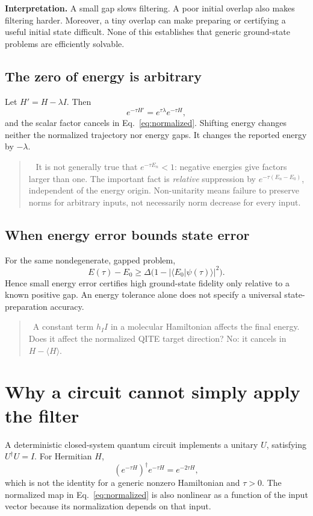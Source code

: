 \documentclass[11pt,a4paper]{article}
\newcommand{\braket}[2]{\langle #1\vert #2\rangle}
\newcommand{\ex}[1]{\langle #1\rangle}
\newcommand{\lesson}[2]{\clearpage\section{#1}\label{#2}}
\newenvironment{idea}[1][Main idea]{\par\smallskip\begin{quotation}\noindent{\bfseries\textcolor{keyblue}{#1.}}\ }{\end{quotation}\smallskip}
\newenvironment{caution}[1][Important distinction]{\par\smallskip\begin{quotation}\noindent{\bfseries\textcolor{alertred}{#1.}}\ }{\end{quotation}\smallskip}
\newcommand{\checkpoint}[1]{\begin{idea}[Pause and check]#1\end{idea}}
\begin{document}
\textbf{Interpretation.} A small gap slows filtering. A poor initial overlap also makes filtering harder. Moreover, a tiny overlap can make preparing or certifying a useful initial state difficult. None of this establishes that generic ground-state problems are efficiently solvable.

\subsection*{The zero of energy is arbitrary}
Let $H'=H-\lambda I$. Then
\[
e^{-\tau H'}=e^{\tau\lambda}e^{-\tau H},
\]
and the scalar factor cancels in Eq.~\eqref{eq:normalized}. Shifting energy changes neither the normalized trajectory nor energy gaps. It changes the reported energy by $-\lambda$.

\begin{caution}[A correction to a common explanation]
It is not generally true that $e^{-\tau E_n}<1$: negative energies give factors larger than one. The important fact is \emph{relative} suppression by $e^{-\tau(E_n-E_0)}$, independent of the energy origin. Non-unitarity means failure to preserve norms for arbitrary inputs, not necessarily norm decrease for every input.
\end{caution}

\subsection*{When energy error bounds state error}
For the same nondegenerate, gapped problem,
\[
E(\tau)-E_0\ge\Delta\bigl(1-|\braket{E_0}{\psi(\tau)}|^2\bigr).
\]
Hence small energy error certifies high ground-state fidelity only relative to a known positive gap. An energy tolerance alone does not specify a universal state-preparation accuracy.

\checkpoint{A constant term $h_I I$ in a molecular Hamiltonian affects the final energy. Does it affect the normalized QITE target direction? No: it cancels in $H-\ex{H}$.}

\lesson{Why a circuit cannot simply apply the filter}{sec:nonunitary}
A deterministic closed-system quantum circuit implements a unitary $U$, satisfying $U^\dagger U=I$. For Hermitian $H$,
\[
(e^{-\tau H})^\dagger e^{-\tau H}=e^{-2\tau H},
\]
which is not the identity for a generic nonzero Hamiltonian and $\tau>0$. The normalized map in Eq.~\eqref{eq:normalized} is also nonlinear as a function of the input vector because its normalization depends on that input.
\end{document}
